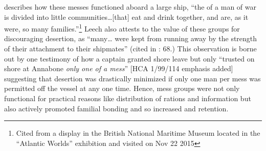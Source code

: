 describes how these messes functioned aboard a large ship, “the  of a man of war is divided into little communities…[that] eat and drink together, and are, as it were, so many families.”\footnote{Cited from a display in the British National Maritime Museum located in the “Atlantic Worlds” exhibition and visited on Nov 22 2015} Leech also attests to the value of these groups for discouraging desertion, as “many… were kept from running away by the strength of their attachment to their shipmates” (cited in \citealt{AdkinsAdkins2008}: 68.) This observation is borne out by one testimony of how a captain granted shore leave but only “trusted on shore at Annabone \textit{only one of a mess}” [HCA 1/99/114 emphasis added] suggesting that desertion was drastically minimized if only one man per mess was permitted off the vessel at any one time. Hence, mess groups were not only functional for practical reasons like distribution of rations and information but also actively promoted familial bonding and so increased  and  retention.  

